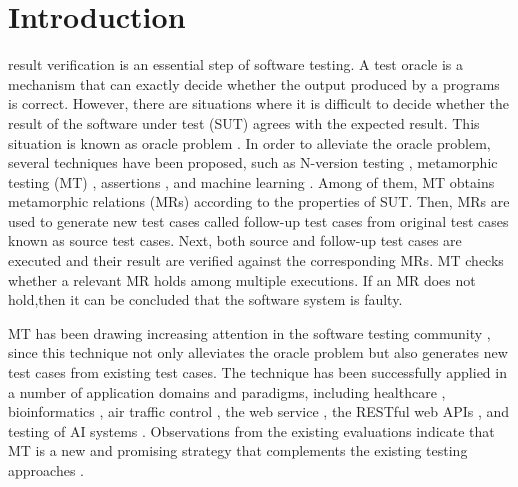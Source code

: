 \documentclass[10pt,journal,compsoc]{IEEEtran}
\begin{document}
\maketitle

\IEEEdisplaynontitleabstractindextext


\IEEEpeerreviewmaketitle


\section{Introduction}
\label{sec:introduction}

 result verification is an essential step of software testing. A test oracle \cite{weyuker1982testing} is a mechanism that can exactly decide whether the output produced by a programs is correct. However, there are situations where it is difficult to decide whether the result of the software under test (SUT) agrees with the expected result. This situation is known as oracle problem \cite{barr2015oracle, patel2018mapping}. In order to alleviate the oracle problem, several techniques have been proposed, such as N-version testing \cite{brilliant1990performance}, metamorphic testing (MT) \cite{chen1998metamorphic, chen2018metamorphic}, assertions \cite{sim2014eliminating}, and machine learning \cite{chan2009pat}. Among of them, MT obtains metamorphic relations (MRs) according to the properties of SUT. Then, MRs are used to generate new test cases called follow-up test cases from original test cases known as source test cases. Next, both source and follow-up test cases are executed and their result are verified against the corresponding MRs. MT checks whether a relevant MR holds among multiple executions. If an MR does not hold,then it can be concluded that the software system is faulty.

MT has been drawing increasing attention in the software testing community \cite{segura2016survey, chen2018metamorphic}, since this technique not only alleviates the oracle problem but also generates new test cases from existing test cases. The technique has been successfully applied in a number of application domains and paradigms, including healthcare \cite{murphy2011effective}, bioinformatics \cite{chen2009innovative}, air traffic control \cite{hui2013metamorphic}, the web service \cite{zhou2012automated}, the RESTful web APIs \cite{segura2018metamorphic}, and testing of AI systems \cite{tian2018deeptest, marijan2019challenges,zhang2020machine}. Observations from the existing evaluations indicate that MT is a new and promising strategy that complements the existing testing approaches \cite{Sun2019METRIC}.
\end{document}
